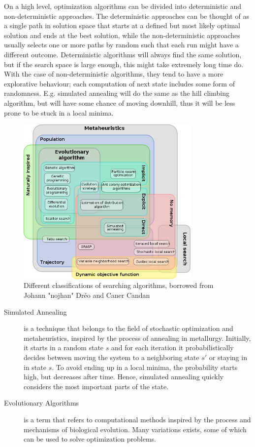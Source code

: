 On a high level, optimization algorithms can be divided into deterministic and
non-deterministic approaches. The deterministic approaches can be thought of as
a single path in solution space that starts at a defined but most likely optimal
solution and ends at the best solution, while the non-deterministic approaches
usually selects one or more paths by random such that each run might have a
different outcome. Deterministic algorithms will always find the same solution,
but if the search space is large enough, this might take extremely long time do.
With the case of non-deterministic algorithms, they tend to have a
more explorative behaviour; each computation of next state includes some
form of randomness. E.g. simulated annealing will do the same as the hill
climbing algorithm, but will have some chance of moving downhill, thus it will
be less prone to be stuck in a local minima.

\begin{figure}
    \centering
    \includegraphics[width=0.8\textwidth]{figs/630px-Metaheuristics_classification.png}
    \caption{Different classifications of searching algorithms, borrowed from Johann "nojhan" Dréo and Caner Candan\cite{wikimetaheuristics}}
    \label{fig:metaheuristics}
\end{figure}

\begin{description}
    \item[Simulated Annealing] is a technique that belongs to the field of
        stochastic optimization and metaheuristics, inspired by the process of
        annealing in metallurgy. Initially, it starts in a random state $s$ and
        for each iteration it probabilistically decides between moving the
        system to a neighboring state $s'$ or staying in in state $s$. To avoid
        ending up in a local minima, the probability starts high, but decreases
        after time. Hence, simulated annealing quickly considers the most
        important parts of the state.
    \item[Evolutionary Algorithms] is a term that refers to computational
        methods inspired by the process and mechanisms of biological evolution.
        Many variations exists, some of which can be used to solve optimization
        problems.

\end{description}


